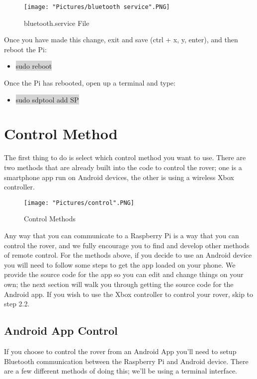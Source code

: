 \documentclass[12pt]{article}
\begin{document}
\begin{figure}[H]
 	\centering
	\texttt{[image: "Pictures/bluetooth service".PNG]}
	\caption{bluetooth.service File}
	\label{bs}
\end{figure}
	
\noindent Once you have made this change, exit and save (ctrl + x, y, enter), and then reboot the Pi:

\begin{itemize}
	\item[] \colorbox{lightgray}{sudo reboot}
\end{itemize}

\noindent Once the Pi has rebooted, open up a terminal and type:
\begin{itemize}
	\item[] \colorbox{lightgray}{sudo sdptool add SP}
\end{itemize}


\section{Control Method}

The first thing to do is select which control method you want to use. There are two methods that are already built into the code to control the rover; one is a smartphone app run on Android devices, the other is using a wireless Xbox controller. 

\begin{figure}[H]
 	\centering
	\texttt{[image: "Pictures/control".PNG]}
 	\caption{Control Methods}
	\label{controls}
\end{figure}

\noindent Any way that you can communicate to a Raspberry Pi is a way that you can control the rover, and we fully encourage you to find and develop other methods of remote control. For the methods above, if you decide to use an Android device you will need to follow some steps to get the app loaded on your phone. We provide the source code for the app so you can edit and change things on your own; the next section will walk you through getting the source code for the Android app.  If you wish to use the Xbox controller to control your rover, skip to step 2.2.

\subsection{Android App Control}
If you choose to control the rover from an Android App you'll need to setup Bluetooth communication between the Raspberry Pi and Android device. There are a few different methods of doing this; we'll be using a terminal interface.
\end{document}
